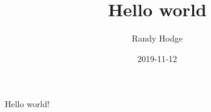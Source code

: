 \documentclass{article}
\title{Hello world}
\date{2019-11-12}
\author{Randy Hodge}
\begin{document}
	\maketitle
	\newpage

	Hello world!
\end{document}
